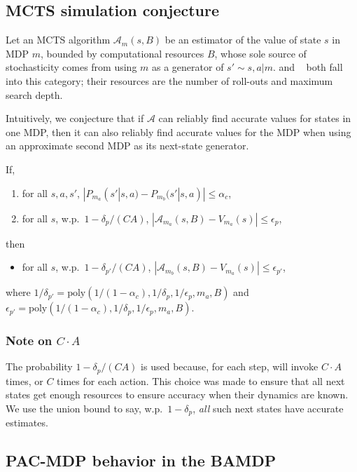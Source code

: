 \subsection{MCTS simulation conjecture}
\label{mcts-conj}

Let an MCTS algorithm $\mathcal{A}_m(s,B)$ be an estimator of the value of state $s$ in MDP $m$, bounded by computational resources $B$, whose sole source of stochasticity comes from using $m$ as a generator of $s'\sim s,a|m$.  and ~\cite{kocsis06} both fall into this category; their resources are the number of roll-outs and maximum search depth.

Intuitively, we conjecture that if $\mathcal{A}$ can reliably find accurate values for states in one MDP, then it can also reliably find accurate values for the MDP when using an approximate second MDP as its next-state generator.

If,
\begin{enumerate}
\item \label{mcts-bound} for all $s,a,s'$, $|P_{m_a}(s'|s,a) - P_{m_b}(s'|s,a)| \leq \alpha_c$,
\item \label{mcts-good} for all $s$, w.p.\ $1-\delta_p/(CA)$, $|\mathcal{A}_{m_a}(s,B)-V_{m_a}(s)|\leq \epsilon_p$,
\end{enumerate}
then
\begin{itemize}
\item for all $s$, w.p.\ $1-\delta_{p'}/(CA)$, $|\mathcal{A}_{m_b}(s,B)-V_{m_a}(s)|\leq \epsilon_{p'}$,
\end{itemize}
where $1/\delta_{p'}=\mbox{poly}(1/(1-\alpha_c),1/\delta_p,1/\epsilon_p,m_a,B)$ and $\epsilon_{p'}=\mbox{poly}(1/(1-\alpha_c),1/\delta_p,1/\epsilon_p,m_a,B)$.

\subsubsection{Note on $C \cdot A$}
The probability $1-\delta_{p}/(CA)$ is used because, for each step,  will invoke  $C \cdot A$ times, or $C$ times for each action.  This choice was made to ensure that all next states get enough resources to ensure accuracy when their dynamics are known. We use the union bound to say, w.p.\ $1-\delta_p$, \emph{all} such next states have accurate estimates.

\subsection{PAC-MDP behavior in the BAMDP}


